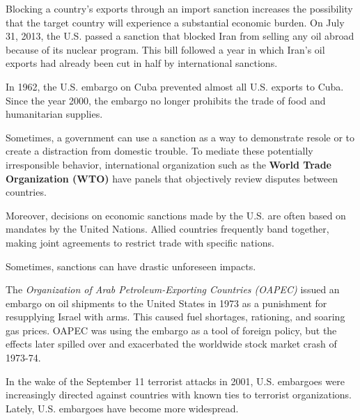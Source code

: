 \documentclass{article}
\begin{document}
  \begin{example}
    \label{ex:bill-h-r-850-world-vs-iran}
    Blocking a country's exports through an import sanction increases the possibility that the target country will experience a substantial economic burden. On July 31, 2013, the U.S. passed a sanction that blocked Iran from selling any oil abroad because of its nuclear program. This bill followed a year in which Iran's oil exports had already been cut in half by international sanctions. 
  \end{example}

  \begin{example}
    \label{ex:u-s-embargo-on-cuba}
    In 1962, the U.S. embargo on Cuba prevented almost all U.S. exports to Cuba. Since the year 2000, the embargo no longer prohibits the trade of food and humanitarian supplies. 
  \end{example}

  \begin{definition}[WTO]
    \label{def:wto}
    Sometimes, a government can use a sanction as a way to demonstrate resole or to create a distraction from domestic trouble. To mediate these potentially irresponsible behavior, international organization such as the \textbf{World Trade Organization (WTO)} have panels that objectively review disputes between countries. 

    Moreover, decisions on economic sanctions made by the U.S. are often based on mandates by the United Nations. Allied countries frequently band together, making joint agreements to restrict trade with specific nations. 
  \end{definition}

  Sometimes, sanctions can have drastic unforeseen impacts. 

  \begin{example}
    \label{ex:oapec-embargo-on-u-s}
    The \textit{Organization of Arab Petroleum-Exporting Countries (OAPEC)} issued an embargo on oil shipments to the United States in 1973 as a punishment for resupplying Israel with arms. This caused fuel shortages, rationing, and soaring gas prices. OAPEC was using the embargo as a tool of foreign policy, but the effects later spilled over and exacerbated the worldwide stock market crash of 1973-74. 
  \end{example}

  \begin{example}
    \label{ex:embargoes-after-9-11-attacks}
    In the wake of the September 11 terrorist attacks in 2001, U.S. embargoes were increasingly directed against countries with known ties to terrorist organizations. Lately, U.S. embargoes have become more widespread. 
  \end{example}
\end{document}
